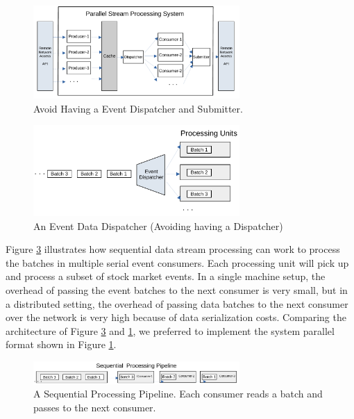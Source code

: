 \begin{figure}[]
    \begin{center}
        \includegraphics[width=0.7\textwidth]{./images/Parallel-Stream-Processing-System}
        \caption{Avoid Having a Event Dispatcher and Submitter.}
        \label{fig:parallel-srream-processing}
    \end{center}
\end{figure}


\begin{figure}[]
    \begin{center}
        \includegraphics[width=0.7\textwidth]{./images/Stream-Batch-Distributions}
        \caption{An Event Data Dispatcher (Avoiding having a Dispatcher)}
        \label{fig:batch-distributions}
    \end{center}
\end{figure}

Figure \ref{fig:Sequential-batch-distributions} illustrates how sequential data stream processing can work to process the batches in multiple
serial event consumers. Each processing unit will pick up and process a subset of stock market events.
In a single machine setup, the overhead of passing the event batches to the next consumer is very small, but in a distributed setting, the
overhead of passing data batches to the next consumer over the network is very high because of data serialization costs. Comparing the
architecture of Figure \ref{fig:Sequential-batch-distributions} and \ref{fig:parallel-srream-processing}, we preferred to implement the system
parallel format shown in Figure \ref{fig:parallel-srream-processing}.

\begin{figure}[]
    \begin{center}
        \includegraphics[width=0.7\textwidth]{./images/Stream-Batch-Distributions_op2}
        \caption{A Sequential Processing Pipeline. Each consumer reads a batch and passes to the next consumer. }
        \label{fig:Sequential-batch-distributions}
    \end{center}
\end{figure}

